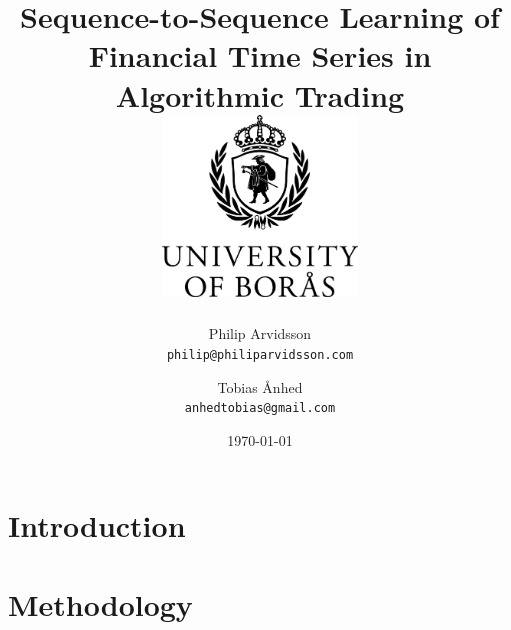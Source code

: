 \documentclass[11pt]{report}
\title{
  {\huge{Sequence-to-Sequence Learning of Financial Time Series in Algorithmic
         Trading}}\\
  \vspace{10ex}
  \includegraphics[width=52mm]{HB_EN_logo1_K}
  \vspace{4ex}
}
\author{
       \LARGE{Philip Arvidsson} \\ \texttt{philip@philiparvidsson.com}
  \and \LARGE{Tobias Ånhed}     \\ \texttt{anhedtobias@gmail.com}
}
\date{\vspace{10ex}\today}
\begin{document}
  \maketitle

  

  \begingroup
    \let\clearpage\relax
    \let\cleardoublepage\relax
    \tableofcontents
  \endgroup

  \chapter{Introduction}
  

  \chapter{Methodology}
  

  {}
\end{document}

